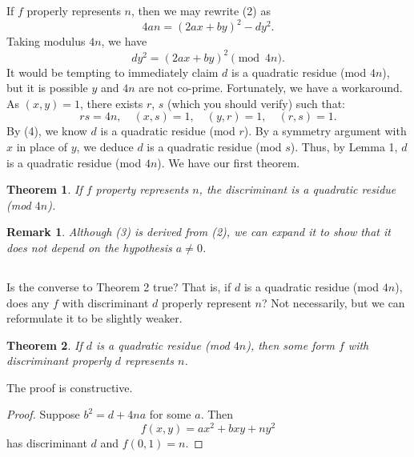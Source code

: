 \documentclass[12pt]{article}
\newtheorem{theorem}{Theorem}
\newtheorem*{remark}{Remark}
\begin{document}
\subsection{}
If $f$ properly represents $n$, then we may rewrite (2) as
\begin{equation}
    4an = (2ax + by)^{2} - dy^{2}.
\end{equation}
Taking modulus $4n$, we have
\begin{equation}
    dy^{2} = (2ax + by)^{2} \pmod{4n}.
\end{equation}
It would be tempting to immediately claim $d$ is a quadratic residue (mod $4n$), but it is possible $y$ and $4n$ are not co-prime. Fortunately, we have a workaround. As $(x,y) = 1$, there exists $r$, $s$ (which you should verify) such that:
\begin{equation}
    rs = 4n, \quad (x,s) = 1, \quad (y, r) = 1, \quad (r, s) = 1.
\end{equation}
By (4), we know $d$ is a quadratic residue (mod $r$). By a symmetry argument with $x$ in place of $y$, we deduce $d$ is a quadratic residue (mod $s$). Thus, by Lemma 1, $d$ is a quadratic residue (mod $4n$). We have our first theorem.
\begin{theorem}
    If $f$ property represents $n$, the discriminant is a quadratic residue (mod $4n$).
\end{theorem}
\begin{remark}
    Although (3) is derived from (2), we can expand it to show that it does not depend on the hypothesis $a \neq 0$.
\end{remark}

\subsection{}
Is the converse to Theorem 2 true? That is, if $d$ is a quadratic residue (mod $4n$), does any $f$ with discriminant $d$ properly represent $n$? Not necessarily, but we can reformulate it to be slightly weaker.
\begin{theorem}
    If $d$ is a quadratic residue (mod $4n$), then some form $f$ with discriminant properly $d$ represents $n$.
\end{theorem}
The proof is constructive.
\begin{proof}
    Suppose $b^{2} = d + 4na$ for some $a$. Then
    \begin{equation*}
        f(x,y) = ax^{2} + bxy + ny^{2}
    \end{equation*}
    has discriminant $d$ and $f(0, 1) = n$.
\end{proof}
\end{document}
